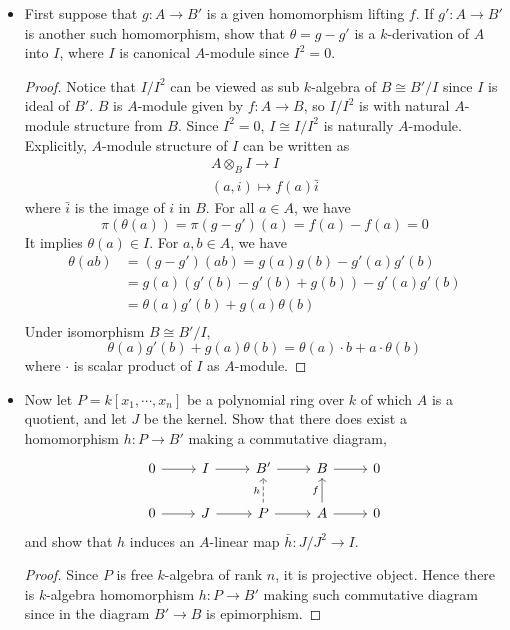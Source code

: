 \documentclass[a4paper]{amsart}
\theoremstyle{definition}
\theoremstyle{plain}
\begin{document}
	\begin{itemize}
		\item  First suppose that $g: A \to B'$ is a given homomorphism lifting $f$. If $g' \colon A \to B'$  is another such homomorphism, show that $\theta = g-g'$ is a $k$-derivation of $A$ into $I$, where $I$ is canonical $A$-module since $I^2 =0$.
		\begin{proof}
			Notice that $I/I^2$ can be viewed as sub $k$-algebra of $B \cong B'/I$ since $I$ is ideal of $B'$. $B$ is $A$-module given by $f \colon A \to B$, so $I/I^2$ is with natural $A$-module structure from $B$. Since $I^2 =0$, $I \cong I/I^2$ is naturally $A$-module. Explicitly, $A$-module structure of $I$ can be written as\[
			\begin{aligned}
			A \otimes_B I \to I \\
			(a,i) \mapsto f(a) \bar{i}
			\end{aligned}
			\]
			where $\bar{i}$ is the image of $i$ in $B$.
			For all $a \in A$, we have \[
			\pi(\theta(a)) = \pi(g-g')(a) = f(a)- f(a) =0
			\]
			It implies $\theta(a) \in I$. For $a, b \in A$, we have 
			\[
			\begin{aligned}
			\theta(ab) &= (g-g')(ab)= g(a)g(b) - g'(a)g'(b)\\
			& =g(a)(g'(b)- g'(b) + g(b)) - g'(a)g'(b)\\
			& =\theta(a)g'(b)+ g(a)\theta(b)\\
			\end{aligned}
			\]
			Under isomorphism $B \cong B'/I$, 
			\[
			\theta(a)g'(b) + g(a)\theta(b) = \theta(a) \cdot b + a \cdot \theta(b)
			\]
			where $\cdot$ is scalar product of $I$ as $A$-module.
		\end{proof}
	\item Now let $P= k[x_1, \cdots, x_n]$ be a polynomial ring over $k$ of which $A$ is a quotient, and let $J$ be the kernel. Show that there does exist a homomorphism $h \colon P \to B'$ making a commutative diagram,
	\[
	\begin{tikzcd}
	0 \ar[r]& I \ar[r] & B' \ar[r] & B \ar[r] & 0\\
	0 \ar[r] & J \ar[r] & P \ar[r] \ar[u,"h",dashed] & A\ar[u,"f"] \ar[r] & 0
	\end{tikzcd}
	\]
	and show that $h$ induces an $A$-linear map $\bar{h} \colon J/J^2 \to I$.
	\begin{proof}
		Since $P$ is free $k$-algebra of rank $n$, it is projective object. Hence there is $k$-algebra homomorphism $h \colon P \to B'$ making such commutative diagram since in the diagram $B' \to B$ is epimorphism.

\end{proof}
\end{itemize}
\end{document}
